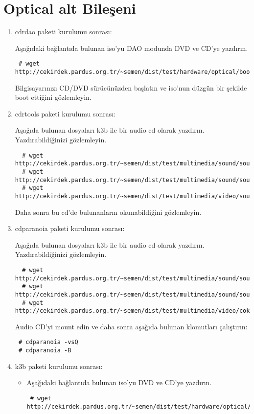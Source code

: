 \documentclass[a4paper,10pt]{article}
\begin{document}
\section{Optical alt Bileşeni}
\begin{enumerate}
\item cdrdao paketi kurulumu sonrası:

Aşağıdaki bağlantıda bulunan iso'yu DAO modunda DVD ve CD'ye yazdırın. 
\begin{verbatim}
 # wget http://cekirdek.pardus.org.tr/~semen/dist/test/hardware/optical/boot.iso
\end{verbatim}

Bilgisayarınızı CD/DVD sürücünüzden başlatın ve iso'nun düzgün bir şekilde boot ettiğini gözlemleyin.


 \item cdrtools paketi kurulumu sonrası:

Aşağıda bulunan dosyaları k3b ile bir audio cd olarak yazdırın. Yazdırabildiğinizi gözlemleyin.
 \begin{verbatim}
  # wget http://cekirdek.pardus.org.tr/~semen/dist/test/multimedia/sound/sound/sample.wav
  # wget http://cekirdek.pardus.org.tr/~semen/dist/test/multimedia/sound/sound/sample.mp3
  # wget http://cekirdek.pardus.org.tr/~semen/dist/test/multimedia/video/sound/sample.ogg
 \end{verbatim}

Daha sonra bu cd'de bulunanların okunabildiğini gözlemleyin.
 \item cdparanoia paketi kurulumu sonrası:

Aşağıda bulunan dosyaları k3b ile bir audio cd olarak yazdırın. Yazdırabildiğinizi gözlemleyin.
 \begin{verbatim}
  # wget http://cekirdek.pardus.org.tr/~semen/dist/test/multimedia/sound/sound/sample.wav
  # wget http://cekirdek.pardus.org.tr/~semen/dist/test/multimedia/sound/sound/sample.mp3
  # wget http://cekirdek.pardus.org.tr/~semen/dist/test/multimedia/video/cokluortam/linux.ogg
 \end{verbatim}

Audio CD'yi mount edin ve daha sonra aşağıda bulunan klomutları çalıştırın:
\begin{verbatim}
 # cdparanoia -vsQ
 # cdparanoia -B
\end{verbatim}

\item k3b paketi kurulumu sonrası:
\begin{itemize}
\item Aşağıdaki bağlantıda bulunan iso'yu DVD ve CD'ye yazdırın. 
\begin{verbatim}
 # wget http://cekirdek.pardus.org.tr/~semen/dist/test/hardware/optical/boot.iso
\end{verbatim}


\end{itemize}
\end{enumerate}
\end{document}
